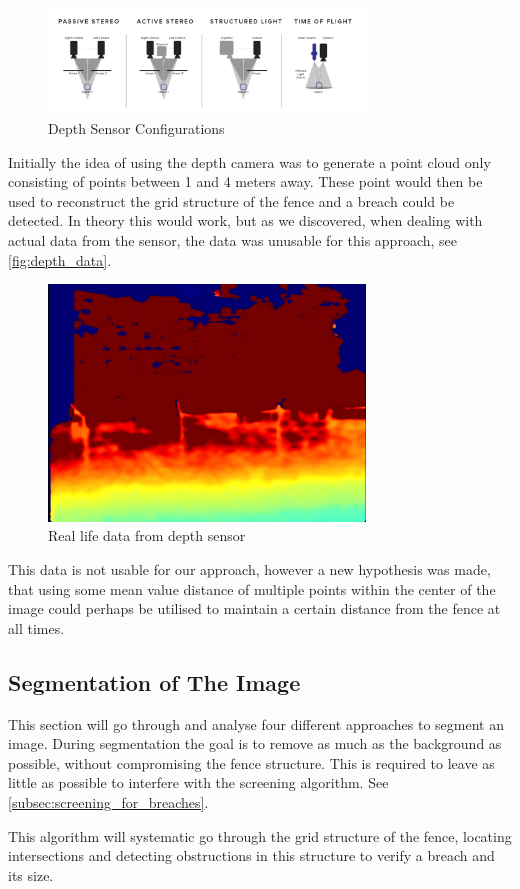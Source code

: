 \documentclass[../Head/Main.tex]{subfiles}
\begin{document}
\begin{figure}[H]
    \centering
    \includegraphics[width=0.75\textwidth]{../Figures/active_IR.png}
    \caption{Depth Sensor Configurations}
    \label{fig:depth_data}
\end{figure}

Initially the idea of using the depth camera was to generate a point cloud only consisting of points between 1 and 4 meters away. These point would then be used to reconstruct the grid structure of the fence and a breach could be detected. In theory this would work, but as we discovered, when dealing with actual data from the sensor, the data was unusable for this approach, see \autoref{fig:depth_data}.

\begin{figure}[H]
    \centering
    \includegraphics[width=0.75\textwidth]{../Figures/depth_img.png}
    \caption{Real life data from depth sensor}
    \label{fig:depth_data}
\end{figure}

This data is not usable for our approach, however a new hypothesis was made, that using some mean value distance of multiple points within the center of the image could perhaps be utilised to maintain a certain distance from the fence at all times. 

\subsection{Segmentation of The Image}
\label{subsec:seg_image}
This section will go through and analyse four different approaches to segment an image. During segmentation the goal is to remove as much as the background as possible, without compromising the fence structure. This is required to leave as little as possible to interfere with the screening algorithm. See \autoref{subsec:screening_for_breaches}. 
\par 
This algorithm will systematic go through the grid structure of the fence, locating intersections and detecting obstructions in this structure to verify a breach and its size.
\end{document}
